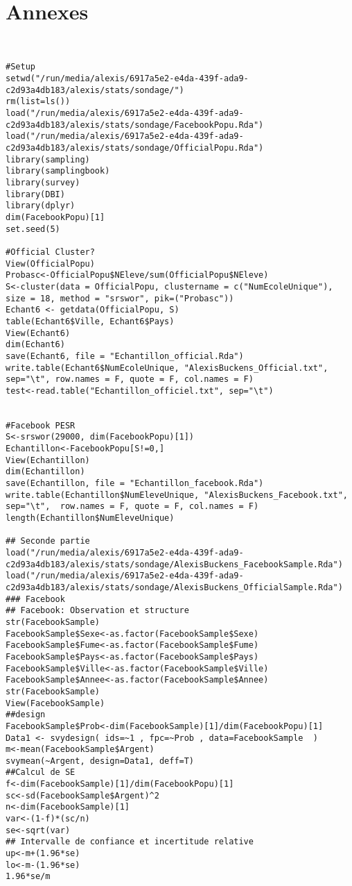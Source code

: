 \documentclass[11pt,a4paper]{report}
\begin{document}
\section*{Annexes}
\lstset{language=R}
\begin{lstlisting}[breaklines]


#Setup
setwd("/run/media/alexis/6917a5e2-e4da-439f-ada9-c2d93a4db183/alexis/stats/sondage/")
rm(list=ls())
load("/run/media/alexis/6917a5e2-e4da-439f-ada9-c2d93a4db183/alexis/stats/sondage/FacebookPopu.Rda")
load("/run/media/alexis/6917a5e2-e4da-439f-ada9-c2d93a4db183/alexis/stats/sondage/OfficialPopu.Rda")
library(sampling)
library(samplingbook)
library(survey)
library(DBI)
library(dplyr)
dim(FacebookPopu)[1]
set.seed(5)

#Official Cluster?
View(OfficialPopu)
Probasc<-OfficialPopu$NEleve/sum(OfficialPopu$NEleve)
S<-cluster(data = OfficialPopu, clustername = c("NumEcoleUnique"), size = 18, method = "srswor", pik=("Probasc"))
Echant6 <- getdata(OfficialPopu, S)
table(Echant6$Ville, Echant6$Pays)
View(Echant6)
dim(Echant6)
save(Echant6, file = "Echantillon_official.Rda")
write.table(Echant6$NumEcoleUnique, "AlexisBuckens_Official.txt", sep="\t", row.names = F, quote = F, col.names = F) 
test<-read.table("Echantillon_officiel.txt", sep="\t")


#Facebook PESR
S<-srswor(29000, dim(FacebookPopu)[1])
Echantillon<-FacebookPopu[S!=0,]
View(Echantillon)
dim(Echantillon)
save(Echantillon, file = "Echantillon_facebook.Rda")
write.table(Echantillon$NumEleveUnique, "AlexisBuckens_Facebook.txt", sep="\t",  row.names = F, quote = F, col.names = F) 
length(Echantillon$NumEleveUnique)

## Seconde partie
load("/run/media/alexis/6917a5e2-e4da-439f-ada9-c2d93a4db183/alexis/stats/sondage/AlexisBuckens_FacebookSample.Rda")
load("/run/media/alexis/6917a5e2-e4da-439f-ada9-c2d93a4db183/alexis/stats/sondage/AlexisBuckens_OfficialSample.Rda")
### Facebook
## Facebook: Observation et structure
str(FacebookSample)
FacebookSample$Sexe<-as.factor(FacebookSample$Sexe)
FacebookSample$Fume<-as.factor(FacebookSample$Fume)
FacebookSample$Pays<-as.factor(FacebookSample$Pays)
FacebookSample$Ville<-as.factor(FacebookSample$Ville)
FacebookSample$Annee<-as.factor(FacebookSample$Annee)
str(FacebookSample)
View(FacebookSample)
##design
FacebookSample$Prob<-dim(FacebookSample)[1]/dim(FacebookPopu)[1]
Data1 <- svydesign( ids=~1 , fpc=~Prob , data=FacebookSample  )
m<-mean(FacebookSample$Argent)
svymean(~Argent, design=Data1, deff=T)
##Calcul de SE
f<-dim(FacebookSample)[1]/dim(FacebookPopu)[1]
sc<-sd(FacebookSample$Argent)^2
n<-dim(FacebookSample)[1]
var<-(1-f)*(sc/n)
se<-sqrt(var)
## Intervalle de confiance et incertitude relative
up<-m+(1.96*se)
lo<-m-(1.96*se)
1.96*se/m




\end{lstlisting}
\end{document}
